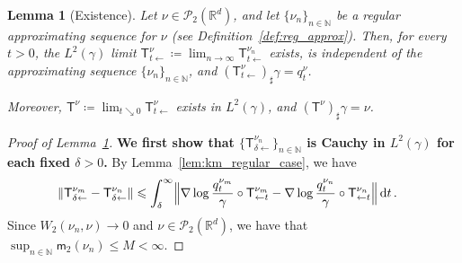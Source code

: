 \documentclass[10pt,a4paper]{amsart}
\newtheorem{lemma}{Lemma}
\newcommand{\KM}{\mathsf T}
\newcommand{\N}{\mathbb{N}}
\newcommand{\R}{\RR}
\newcommand{\RR}{\mathbb{R}}
\newcommand{\cP}{\mathcal{P}}
\newcommand*{\dd}{\, \rd}
\newcommand{\deq}{\coloneqq}
\renewcommand{\le}{\leqslant}
\newcommand{\mom}{\mathsf m_2}
\newcommand*{\rd}{\mathrm{d}}
\begin{document}
\begin{lemma}[Existence]\label{lem:existence_km}
    Let $\nu \in \cP_2(\R^d)$, and let $\{\nu_n\}_{n\in\N}$ be a regular approximating sequence for $\nu$ (see Definition~\ref{def:reg_approx}).
    Then, for every $t > 0$, the $L^2(\gamma)$ limit $\KM^\nu_{t\gets} \deq \lim_{n\to\infty} \KM^{\nu_n}_{t\gets}$ exists, is independent of the approximating sequence $\{\nu_n\}_{n\in\N}$, and $(\KM^\nu_{t\gets})_\sharp \gamma = q_t^\nu$.

    Moreover, $\KM^\nu \deq \lim_{t\searrow 0} \KM^\nu_{t\gets}$ exists in $L^2(\gamma)$, and $(\KM^\nu)_\sharp \gamma = \nu$.
\end{lemma}

\begin{proof}[Proof of Lemma~\ref{lem:existence_km}]
    \textbf{We first show that $\{\KM^{\nu_n}_{\delta\gets}\}_{n\in\N}$ is Cauchy in $L^2(\gamma)$ for each fixed $\delta > 0$.}
    By Lemma~\ref{lem:km_regular_case}, we have
    \begin{align*}
        \|\KM^{\nu_m}_{\delta\gets} - \mathsf T^{\nu_{n}}_{\delta\gets}\|
        &\le \int_\delta^\infty\Bigl\lVert \nabla \log \frac{q_t^{\nu_m}}{\gamma} \circ \KM^{\nu_m}_{\gets t} - \nabla \log \frac{q_t^{\nu_n}}{\gamma} \circ \KM^{\nu_n}_{\gets t}\Bigr\rVert\dd t\,.
    \end{align*}
    Since $W_2(\nu_n,\nu) \to 0$ and $\nu \in \cP_2(\R^d)$, we have that $\sup_{n\in\N} \mom(\nu_n) \le M < \infty$.


\end{proof}
\end{document}
